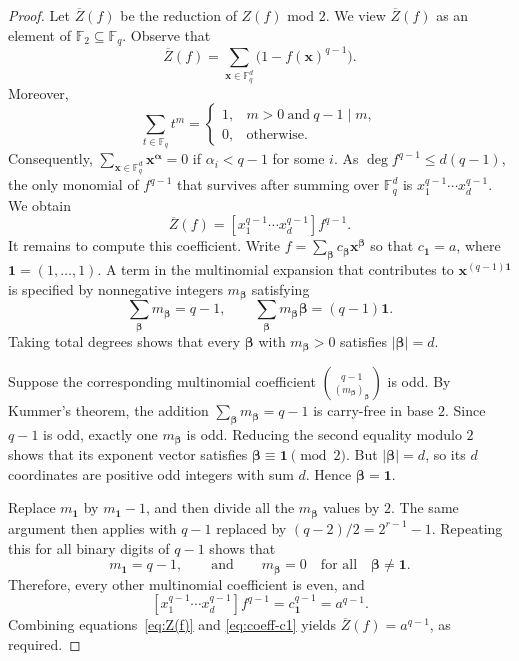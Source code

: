 \documentclass[12pt,reqno]{amsart}
\theoremstyle{definition}
\newcommand{\F}{\mathbb{F}}
\begin{document}
\begin{proof}
Let $\overline{Z}(f)$ be the reduction of $Z(f)$ mod $2$. We view $\overline{Z}(f)$ as an element of $\F_2\subseteq\F_q$. Observe that
\[
\overline{Z}(f)=\sum_{\mathbf x\in\mathbb F_q^d}\bigl(1-f(\mathbf x)^{q-1}\bigr).
\]
Moreover,
\[
\sum_{t\in\mathbb F_q}t^m=
\begin{cases}
1,& m>0\ \text{and}\ q-1\mid m,\\
0,&\text{otherwise}.
\end{cases}
\]
Consequently, $\sum_{\mathbf{x}\in\F_q^{d}} \mathbf{x}^{\boldsymbol{\alpha}}=0$ if $\alpha_i<q-1$ for some $i$. As $\deg f^{q-1}\le d(q-1)$, the only monomial of $f^{q-1}$ that
survives after summing over $\mathbb F_q^d$ is
$x_1^{q-1}\cdots x_d^{q-1}$. We obtain
\begin{equation}\label{eq:Z(f)}
\overline{Z}(f)=[x_1^{q-1}\cdots x_d^{q-1}]f^{q-1}.
\end{equation}
It remains to compute this coefficient. Write $f=\sum_{\boldsymbol{\beta}} c_{\boldsymbol{\beta}}\mathbf{x}^{\boldsymbol{\beta}}$ so that $c_{\mathbf 1}=a$, where $\mathbf{1}=(1,\ldots,1)$. A term in the multinomial expansion that
contributes to $\mathbf x^{(q-1)\mathbf1}$ is specified by
nonnegative integers $m_{\boldsymbol\beta}$ satisfying
\[
\sum_{\boldsymbol{\beta}} m_{\boldsymbol{\beta}}=q-1,
\qquad
\sum_{\boldsymbol{\beta}} m_{\boldsymbol{\beta}}\boldsymbol{\beta}=(q-1)\mathbf 1.
\]
Taking total degrees shows that every $\boldsymbol{\beta}$ with $m_{\boldsymbol{\beta}}>0$ satisfies $|\boldsymbol{\beta}|=d$.

Suppose the corresponding multinomial coefficient $\binom{q-1}{(m_{\boldsymbol{\beta}})_{\boldsymbol{\beta}}}$ is odd. By Kummer's theorem, the 
addition $\sum_{\boldsymbol{\beta}}m_{\boldsymbol{\beta}}=q-1$ is carry-free in base $2$. Since \(q-1\) is odd,
exactly one \(m_{\boldsymbol{\beta}}\) is odd. Reducing the second equality modulo \(2\)
shows that its exponent vector satisfies
$\boldsymbol{\beta}\equiv\mathbf 1\pmod 2$. 
But \(|\boldsymbol{\beta}|=d\), so its \(d\) coordinates are positive odd integers with
sum \(d\). Hence \(\boldsymbol{\beta}=\mathbf 1\).

Replace $m_{\mathbf 1}$ by $m_{\mathbf 1}-1$, and then divide all the $m_{\boldsymbol{\beta}}$ values by $2$. The same argument then applies with $q-1$ replaced by $(q-2)/2=2^{r-1}-1$. Repeating this for all binary digits of $q-1$ shows that
\[
m_{\mathbf 1}=q-1, \qquad \text{and}
\qquad
m_{\boldsymbol{\beta}}=0 \quad \text{for all} \quad \boldsymbol{\beta}\ne\mathbf 1.
\]
Therefore, every other multinomial coefficient is even, and
\begin{equation}\label{eq:coeff-c1}
[x_1^{q-1}\cdots x_d^{q-1}]f^{q-1}
=c_{\mathbf 1}^{q-1}=a^{q-1}.
\end{equation}
Combining equations~\eqref{eq:Z(f)} and \eqref{eq:coeff-c1} yields $\overline{Z}(f)=a^{q-1}$, 
as required.
\end{proof}
\end{document}

